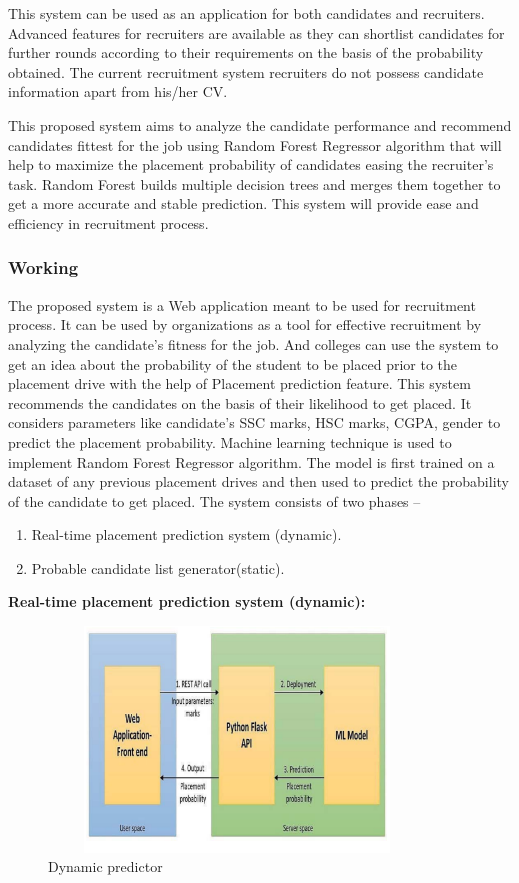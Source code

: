 \documentclass[12pt]{article}
\begin{document}
This system can be used as an application for both candidates and 
recruiters. Advanced features for recruiters are 
available as they can shortlist candidates for further 
rounds according to their requirements on the basis 
of the probability obtained. The current recruitment 
system recruiters do not possess candidate 
information apart from his/her CV. 

This proposed system aims to analyze the candidate performance 
and recommend candidates fittest for the job using 
Random Forest Regressor algorithm that will help to 
maximize the placement probability of candidates 
easing the recruiter’s task. Random Forest builds 
multiple decision trees and merges them together to 
get a more accurate and stable prediction. This 
system will provide ease and efficiency in recruitment 
process.

\newpage
\subsubsection{Working}
The proposed system is a Web application meant 
to be used for recruitment process. It can be used 
by organizations as a tool for effective 
recruitment by analyzing the candidate’s fitness 
for the job. And colleges can use the system to get 
an idea about the probability of the student to be 
placed prior to the placement drive with the help 
of Placement prediction feature. This system 
recommends the candidates on the basis of their 
likelihood to get placed. It considers parameters 
like candidate’s SSC marks, HSC marks, CGPA, 
gender to predict the placement probability. 
Machine learning technique is used to implement 
Random Forest Regressor algorithm. The model 
is first trained on a dataset of any previous 
placement drives and then used to predict the 
probability of the candidate to get placed.
The system consists of two phases – 
\begin{enumerate}
\item Real-time placement prediction system (dynamic).
\item Probable candidate list generator(static).
\end{enumerate}
\textbf{Real-time placement prediction system (dynamic):}

\begin{figure}[H]
\begin{center}
 \includegraphics[width=10cm, height=6cm]{L5P1}
\caption{Dynamic predictor }
\end{center}
\end{figure}
\end{document}
